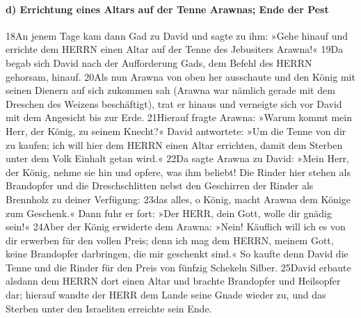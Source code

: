 \hypertarget{d-errichtung-eines-altars-auf-der-tenne-arawnas-ende-der-pest}{%
\paragraph{d) Errichtung eines Altars auf der Tenne Arawnas; Ende der
Pest}\label{d-errichtung-eines-altars-auf-der-tenne-arawnas-ende-der-pest}}

18An jenem Tage kam dann Gad zu David und sagte zu ihm: »Gehe hinauf und
errichte dem HERRN einen Altar auf der Tenne des Jebusiters Arawna!«
19Da begab sich David nach der Aufforderung Gads, dem Befehl des HERRN
gehorsam, hinauf. 20Als nun Arawna von oben her ausschaute und den König
mit seinen Dienern auf sich zukommen sah (Arawna war nämlich gerade mit
dem Dreschen des Weizens beschäftigt), trat er hinaus und verneigte sich
vor David mit dem Angesicht bis zur Erde. 21Hierauf fragte Arawna:
»Warum kommt mein Herr, der König, zu seinem Knecht?« David antwortete:
»Um die Tenne von dir zu kaufen; ich will hier dem HERRN einen Altar
errichten, damit dem Sterben unter dem Volk Einhalt getan wird.« 22Da
sagte Arawna zu David: »Mein Herr, der König, nehme sie hin und opfere,
was ihm beliebt! Die Rinder hier stehen als Brandopfer und die
Dreschschlitten nebst den Geschirren der Rinder als Brennholz zu deiner
Verfügung: 23das alles, o König, macht Arawna dem Könige zum Geschenk.«
Dann fuhr er fort: »Der HERR, dein Gott, wolle dir gnädig sein!« 24Aber
der König erwiderte dem Arawna: »Nein! Käuflich will ich es von dir
erwerben für den vollen Preis; denn ich mag dem HERRN, meinem Gott,
keine Brandopfer darbringen, die mir geschenkt sind.« So kaufte denn
David die Tenne und die Rinder für den Preis von fünfzig Schekeln
Silber. 25David erbaute alsdann dem HERRN dort einen Altar und brachte
Brandopfer und Heilsopfer dar; hierauf wandte der HERR dem Lande seine
Gnade wieder zu, und das Sterben unter den Israeliten erreichte sein
Ende.
